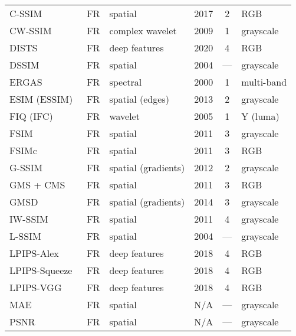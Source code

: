 \begin{landscape}
\begin{longtable}{l l l c c l}
    C-SSIM~\cite{Hassan2017CSSIM}              & FR   & spatial             & 2017 & 2    & RGB \\
    CW-SSIM~\cite{Sampat2009CWSSIM}            & FR   & complex wavelet     & 2009 & 1    & grayscale \\
    DISTS~\cite{Ding2020DISTS}                 & FR   & deep features       & 2020 & 4    & RGB \\
    DSSIM~\cite{Wang2004SSIM}                  & FR   & spatial             & 2004 & ---  & grayscale \\
    ERGAS~\cite{Ranchin2000ERGAS}              & FR   & spectral            & 2000 & 1    & multi-band \\
    ESIM (ESSIM)~\cite{Zhang2013ESSIM}         & FR   & spatial (edges)     & 2013 & 2    & grayscale \\
    FIQ (IFC)~\cite{Sheikh2005IFC}             & FR   & wavelet             & 2005 & 1    & Y (luma) \\
    FSIM~\cite{Zhang2011FSIM}                  & FR   & spatial             & 2011 & 3    & grayscale \\
    FSIMc~\cite{Zhang2011FSIM}                 & FR   & spatial             & 2011 & 3    & RGB \\
    G-SSIM~\cite{Liu2012GSSIM}                 & FR   & spatial (gradients) & 2012 & 2    & grayscale \\
    GMS + CMS~\cite{Zhang2011FSIM}             & FR   & spatial             & 2011 & 3    & RGB \\
    GMSD~\cite{Xue2014GMSD}                    & FR   & spatial (gradients) & 2014 & 3    & grayscale \\
    IW-SSIM~\cite{Li2011IWSSIM}                & FR   & spatial             & 2011 & 4    & grayscale \\
    L-SSIM~\cite{Wang2004SSIM}                 & FR   & spatial             & 2004 & ---  & grayscale \\
    LPIPS-Alex~\cite{Zhang2018LPIPS}           & FR   & deep features       & 2018 & 4    & RGB \\
    LPIPS-Squeeze~\cite{Zhang2018LPIPS}        & FR   & deep features       & 2018 & 4    & RGB \\
    LPIPS-VGG~\cite{Zhang2018LPIPS}            & FR   & deep features       & 2018 & 4    & RGB \\
    MAE~\cite{Gonzalez2008DIP}                 & FR   & spatial             & N/A  & ---  & grayscale \\
    PSNR~\cite{Gonzalez2008DIP}                & FR   & spatial             & N/A  & ---  & grayscale \\

\end{longtable}
\end{landscape}

